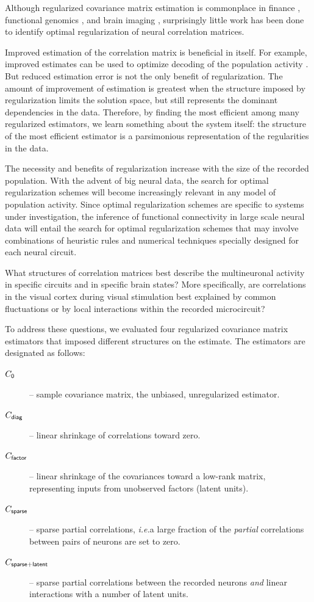 \documentclass[10pt]{article}
\newcommand{\ie}{\emph{i.e.}\;}
\begin{document}
Although regularized covariance matrix estimation is commonplace in finance \cite{Ledoit:2003}, functional genomics \cite{Schafer:2005}, and brain imaging \cite{Ryali:2012}, surprisingly little work has been done to identify optimal regularization of neural correlation matrices. 

Improved estimation of the correlation matrix is beneficial in itself. For example, improved estimates can be used to optimize  decoding of the population activity \cite{Friedman:1989}. But reduced estimation error is not the only benefit of regularization.  The amount of improvement of estimation is greatest when the structure imposed by regularization limits the solution space, but still represents the dominant dependencies in the data. Therefore, by finding the most efficient among many regularized estimators, we learn something about the system itself: the structure of the most efficient estimator is a parsimonious representation of the regularities in the data. 

The necessity and benefits of regularization increase with the size of the recorded population. With the advent of  big neural data, the search for optimal regularization schemes will become increasingly relevant in any model of population activity. Since optimal regularization schemes are specific to systems under investigation, the inference of functional connectivity in large scale neural data will entail the search for optimal regularization schemes that may involve combinations of heuristic rules and numerical techniques specially designed for each neural circuit.

What structures of correlation matrices best describe the multineuronal activity in specific circuits and in specific brain states?  More specifically, are correlations in the visual cortex during visual stimulation best explained by common fluctuations or by local interactions within the recorded microcircuit? 

To address these questions, we evaluated four regularized covariance matrix estimators that imposed different structures on the estimate. The estimators are designated as follows:
\begin{description}
\item[$C_{\sf 0}$] -- sample covariance matrix, the unbiased, unregularized estimator.
\item[$C_{\sf diag}$] -- linear shrinkage of correlations toward zero.
\item[$C_{\sf factor}$] -- linear shrinkage of the covariances toward a low-rank matrix, representing inputs from unobserved factors (latent units).
\item[$C_{\sf sparse}$] -- sparse partial correlations, \ie a large fraction of the \emph{partial} correlations between pairs of neurons are set to zero.
\item[$C_{\sf sparse+latent}$] -- sparse partial correlations between the recorded neurons \emph{and} linear interactions with a number of latent units.
\end{description} 
\end{document}
